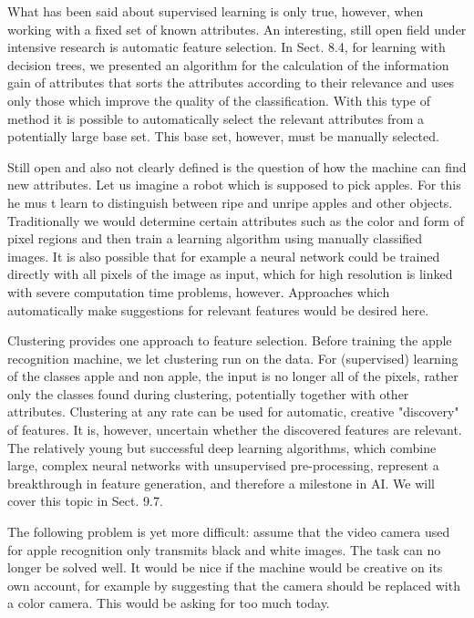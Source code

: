 \documentclass[10pt]{article}
\begin{document}
What has been said about supervised learning is only true, however, when working with a fixed set of known attributes. An interesting, still open field under intensive research is automatic feature selection. In Sect. 8.4, for learning with decision trees, we presented an algorithm for the calculation of the information gain of attributes that sorts the attributes according to their relevance and uses only those which improve the quality of the classification. With this type of method it is possible to automatically select the relevant attributes from a potentially large base set. This base set, however, must be manually selected.

Still open and also not clearly defined is the question of how the machine can find new attributes. Let us imagine a robot which is supposed to pick apples. For this he mus
t learn to distinguish between ripe and unripe apples and other objects. Traditionally we would determine certain attributes such as the color and form of pixel regions and then train a learning algorithm using manually classified images. It is also possible that for example a neural network could be trained directly with all pixels of the image as input, which for high resolution is linked with severe computation time problems, however. Approaches which automatically make suggestions for relevant features would be desired here.

Clustering provides one approach to feature selection. Before training the apple recognition machine, we let clustering run on the data. For (supervised) learning of the classes apple and non apple, the input is no longer all of the pixels, rather only the classes found during clustering, potentially together with other attributes. Clustering at any rate can be used for automatic, creative "discovery" of features. It is, however, uncertain whether the discovered features are relevant. The relatively young but successful deep learning algorithms, which combine large, complex neural networks with unsupervised pre-processing, represent a breakthrough in feature generation, and therefore a milestone in AI. We will cover this topic in Sect. 9.7.

The following problem is yet more difficult: assume that the video camera used for apple recognition only transmits black and white images. The task can no longer be solved well. It would be nice if the machine would be creative on its own account, for example by suggesting that the camera should be replaced with a color camera. This would be asking for too much today.
\end{document}
